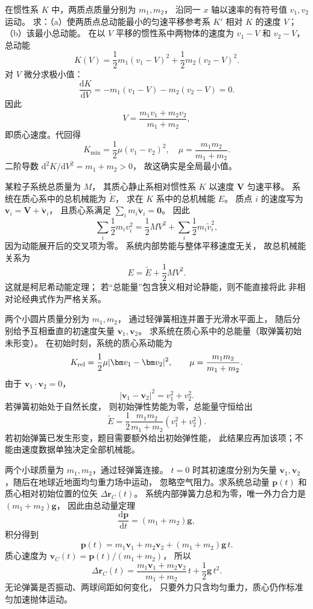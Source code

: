 在惯性系 $K$ 中，两质点质量分别为 $m_1,m_2$，
沿同一 $x$ 轴以速率的有符号值 $v_1,v_2$ 运动。
求：（a）使两质点总动能最小的匀速平移参考系 $K'$
相对 $K$ 的速度 $V$；
（b）该最小总动能。
\exsolution
在以 $V$ 平移的惯性系中两物体的速度为
$v_1-V$ 和 $v_2-V$，总动能
\[
K(V)=\frac12m_1(v_1-V)^2+
\frac12m_2(v_2-V)^2.
\]
对 $V$ 微分求极小值：
\[
\frac{\mathrm dK}{\mathrm dV}
=-m_1(v_1-V)-m_2(v_2-V)=0.
\]
因此
\[
\boxed{V=\frac{m_1v_1+m_2v_2}{m_1+m_2}},
\]
即质心速度。代回得
\[
\boxed{K_{\min}=
\frac12\mu(v_1-v_2)^2},\quad
\mu=\frac{m_1m_2}{m_1+m_2}.
\]
\excheck 二阶导数
$\mathrm d^2K/\mathrm dV^2=m_1+m_2>0$，
故这确实是全局最小值。

某粒子系统总质量为 $M$，
其质心静止系相对惯性系 $K$ 以速度 $\bm V$ 匀速平移。
系统在质心系中的总机械能为 $\widetilde E$，
求在 $K$ 系中的总机械能 $E$。
\exsolution
质点 $i$ 的速度写为
$\bm v_i=\bm V+\widetilde{\bm v}_i$，
且质心系满足
$\sum_i m_i\widetilde{\bm v}_i=\bm0$。
因此
\[
\sum_i\frac12m_i v_i^2
=\frac12M V^2+
\sum_i\frac12m_i\widetilde v_i^2,
\]
因为动能展开后的交叉项为零。
系统内部势能与整体平移速度无关，
故总机械能关系为
\[
\boxed{E=\widetilde E+\frac12M V^2}.
\]
\excheck 这就是柯尼希动能定理；
若“总能量”包含狭义相对论静能，则不能直接将此
非相对论经典式作为严格关系。

两个小圆片质量分别为 $m_1,m_2$，
通过轻弹簧相连并置于光滑水平面上，
随后分别给予互相垂直的初速度矢量
$\bm v_1,\bm v_2$。
求系统在质心系中的总能量（取弹簧初始未形变）。
\exsolution
在初始时刻，系统的质心系动能为
\[
K_{\rm rel}
=\frac12\mu|\bm v_1-\bm v_2|^2,\qquad
\mu=\frac{m_1m_2}{m_1+m_2}.
\]
由于 $\bm v_1\cdot\bm v_2=0$，
\[
|\bm v_1-\bm v_2|^2=v_1^2+v_2^2.
\]
若弹簧初始处于自然长度，
则初始弹性势能为零，总能量守恒给出
\[
\boxed{\widetilde E=
\frac12\frac{m_1m_2}{m_1+m_2}(v_1^2+v_2^2)}.
\]
\excheck 若初始弹簧已发生形变，题目需要额外给出初始弹性能，
此结果应再加该项；不能由速度数据单独决定全部机械能。

两个小球质量为 $m_1,m_2$，通过轻弹簧连接。
$t=0$ 时其初速度分别为矢量
$\bm v_1,\bm v_2$，随后在地球近地面均匀重力场中运动，
忽略空气阻力。求系统总动量 $\bm p(t)$
和质心相对初始位置的位矢 $\Delta\bm r_C(t)$。
\exsolution
系统内部弹簧力总和为零，唯一外力合力是
$(m_1+m_2)\bm g$，
因此由总动量定理
\[
\frac{\mathrm d\bm p}{\mathrm dt}=(m_1+m_2)\bm g,
\]
积分得到
\[
\boxed{\bm p(t)=m_1\bm v_1+m_2\bm v_2
 +(m_1+m_2)\bm g\,t}.
\]
质心速度为
$\bm v_C(t)=\bm p(t)/(m_1+m_2)$，
所以
\[
\boxed{\Delta\bm r_C(t)=
\frac{m_1\bm v_1+m_2\bm v_2}{m_1+m_2}\,t
+\frac12\bm g\,t^2}.
\]
\excheck 无论弹簧是否振动、两球间距如何变化，
只要外力只含均匀重力，质心仍作标准匀加速抛体运动。
